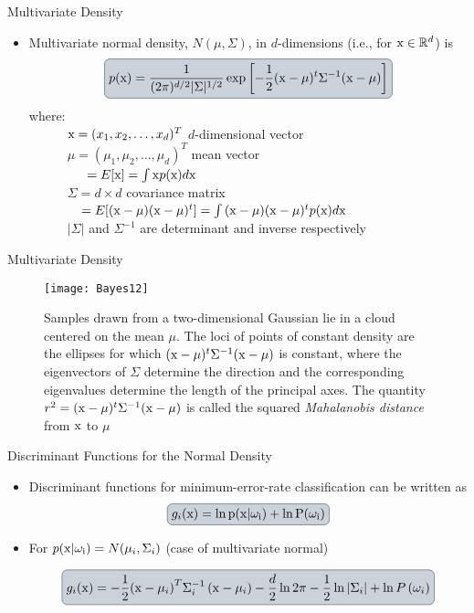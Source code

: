 \begin{frame}{Multivariate Density}
\begin{itemize}
\item Multivariate normal density, $N(\mu,\Sigma)$, in $d$-dimensions (i.e., for ${\rm x}\in \mathbb{R}^d$) is
\[\boxed{p({\rm x})=\frac{1}{(2\pi)^{d/2}|\Sigma|^{1/2}}\exp\left[-\frac{1}{2}({\rm x}-\mu)^t\Sigma^{-1}({\rm x}-\mu)\right]}\]
where:\\
~~~~~~${\rm x}=(x_1,x_2,\ldots,x_d)^T$ $d$-dimensional vector\\
~~~~~~$\mu = (\mu_1,\mu_2,\ldots,\mu_d)^T$ mean vector\\
~~~~~~~~~$= E[{\rm x}]=\int {\rm x}p({\rm x})d{\rm x} $\\
~~~~~~$\Sigma=d\times d$ covariance matrix\\
~~~~~~~~$= E[({\rm x}-\mu)({\rm x}-\mu)^t]=\int {({\rm x}-\mu)({\rm x}-\mu)^t}p({\rm x})d{\rm x} $\\
~~~~~~$|\Sigma|$ and $\Sigma^{-1}$ are determinant and inverse respectively
\end{itemize}
\end{frame}

\begin{frame}{Multivariate Density}
\begin{figure}
\texttt{[image: Bayes12]}
\caption{Samples drawn from a two-dimensional Gaussian lie in a cloud centered on the mean $\mu$. The loci of points of constant density are the ellipses for which $({\rm x -\mu})^t\Sigma^{-1}({\rm x -\mu})$ is constant, where the eigenvectors of
$\Sigma$ determine the direction and the corresponding eigenvalues determine the
length of the principal axes. The quantity $r^2=({\rm x -\mu})^t\Sigma^{-1}({\rm x -\mu})$ is called
the squared \textit{\color{mycolor2}Mahalanobis distance} from ${\rm x}$ to $\mu$}
\end{figure}
\end{frame}

\begin{frame}{Discriminant Functions for the Normal Density}
\begin{itemize}
\item Discriminant functions for minimum-error-rate classification can be written as
\[\boxed{g_i(\rm x)=\ln p({\rm x}|\omega_i)+\ln P(\omega_i)}\]
\item For $p({\rm x|\omega_i})=N(\mu_i,\Sigma_i)$ (case of multivariate normal)

\[\boxed{{g_i}({\rm x}) =  - \frac{1}{2}{\left( {{\rm x} - {\mu _i}} \right)^T}\Sigma _i^{ - 1}\left( {{\rm x} - {\mu _i}} \right) - \frac{d}{2}\ln 2\pi  - \frac{1}{2}\ln \left| {{\Sigma _i}} \right| + \ln P\left( {{\omega _i}} \right)}\]
\end{itemize}
\end{frame}


